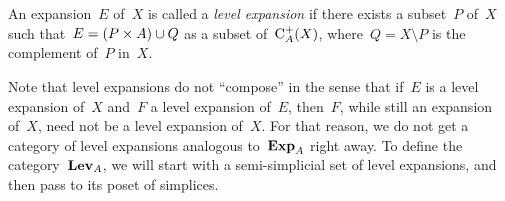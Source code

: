 \begin{Def}
An expansion~$E$ of~$X$ is called a {\em level expansion} if there exists a subset~$P$ of~$X$ such that~\hbox{$E=(P\times A)\cup Q$} as a subset of~$\mathrm{C}_A^+(X)$, where~$Q=X\setminus P$ is the complement of~$P$ in~$X$. 
\end{Def}

Note that level expansions do not ``compose'' in the sense that if~$E$ is a level expansion of~$X$ and~$F$ a level expansion of~$E$, then~$F$, while still an expansion of~$X$, need not be a level expansion of~$X$. For that reason, we do not get a category of level expansions analogous to~$\mathbf{Exp}_A$ right away. To define the category~$\mathbf{Lev}_A$, we will start with a semi-simplicial set of level expansions, and then pass to its poset of simplices.


%

